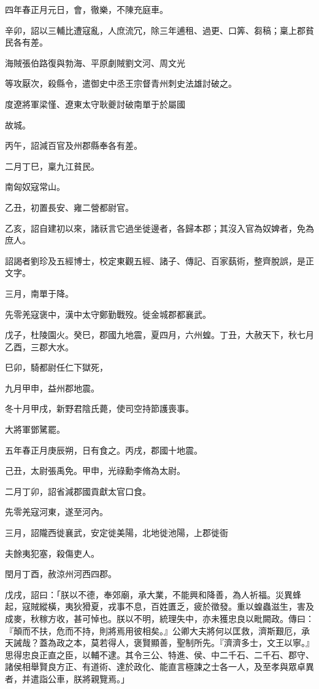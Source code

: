 \begin{pinyinscope}
四年春正月元日，會，徹樂，不陳充庭車。

辛卯，詔以三輔比遭寇亂，人庶流冗，除三年逋租、過更、口筭、芻稿；稟上郡貧民各有差。

海賊張伯路復與勃海、平原劇賊劉文河、周文光

等攻厭次，殺縣令，遣御史中丞王宗督青州刺史法雄討破之。

度遼將軍梁慬、遼東太守耿夔討破南單于於屬國

故城。

丙午，詔減百官及州郡縣奉各有差。

二月丁巳，稟九江貧民。

南匈奴寇常山。

乙丑，初置長安、雍二營都尉官。

乙亥，詔自建初以來，諸祅言它過坐徙邊者，各歸本郡；其沒入官為奴婢者，免為庶人。

詔謁者劉珍及五經博士，校定東觀五經、諸子、傳記、百家蓺術，整齊脫誤，是正文字。

三月，南單于降。

先零羌寇褒中，漢中太守鄭勤戰歿。徙金城郡都襄武。

戊子，杜陵園火。癸巳，郡國九地震，夏四月，六州蝗。丁丑，大赦天下，秋七月乙酉，三郡大水。

巳卯，騎都尉任仁下獄死，

九月甲申，益州郡地震。

冬十月甲戌，新野君陰氏薨，使司空持節護喪事。

大將軍鄧騭罷。

五年春正月庚辰朔，日有食之。丙戌，郡國十地震。

己丑，太尉張禹免。甲申，光祿勳李脩為太尉。

二月丁卯，詔省減郡國貢獻太官口食。

先零羌寇河東，遂至河內。

三月，詔隴西徙襄武，安定徙美陽，北地徙池陽，上郡徙衙

夫餘夷犯塞，殺傷吏人。

閏月丁酉，赦涼州河西四郡。

戊戌，詔曰：「朕以不德，奉郊廟，承大業，不能興和降善，為人祈福。災異蜂起，寇賊縱橫，夷狄猾夏，戎事不息，百姓匱乏，疲於徵發。重以蝗蟲滋生，害及成麥，秋稼方收，甚可悼也。朕以不明，統理失中，亦未獲忠良以毗闕政。傳曰：『顛而不扶，危而不持，則將焉用彼相矣。』公卿大夫將何以匡救，濟斯艱厄，承天誡哉？蓋為政之本，莫若得人，褒賢顯善，聖制所先。『濟濟多士，文王以寧。』思得忠良正直之臣，以輔不逮。其令三公、特進、侯、中二千石、二千石、郡守、諸侯相舉賢良方正、有道術、達於政化、能直言極諫之士各一人，及至孝與眾卓異者，并遣詣公車，朕將親覽焉。」


\end{pinyinscope}

